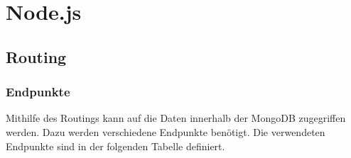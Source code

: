 \chapter{Node.js}

\section{Routing}

\subsection{Endpunkte}

Mithilfe des Routings kann auf die Daten innerhalb der MongoDB zugegriffen werden. Dazu werden verschiedene Endpunkte benötigt. Die verwendeten Endpunkte sind in der folgenden Tabelle definiert.

